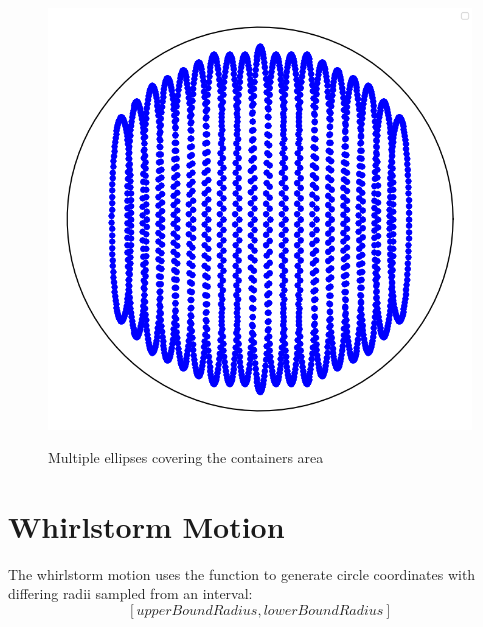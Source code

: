 \begin{figure}[H]
    \includegraphics[scale=0.35]{Graphics/motions/horizontal_elliptical.png}
    \centering
    \label{fig:foldingMotion1}
    \caption{Multiple ellipses covering the containers area}
\end{figure}


\section{Whirlstorm Motion}
The whirlstorm motion uses the function to generate circle coordinates  with differing radii sampled from an interval:
\[[upperBoundRadius, lowerBoundRadius]\]

